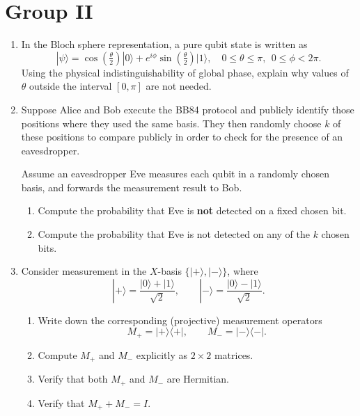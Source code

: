 \documentclass[12pt]{article}
\begin{document}
\section*{Group II}

\begin{enumerate}
\item In the Bloch sphere representation, a pure qubit state is written as
\[
|\psi\rangle
=
\cos\left(\tfrac{\theta}{2}\right)|0\rangle
+
e^{i\phi}\sin\left(\tfrac{\theta}{2}\right)|1\rangle,
\quad
0 \le \theta \le \pi,\ \ 0 \le \phi < 2\pi.
\]
Using the physical indistinguishability of global phase, explain why values of $\theta$ outside the interval $[0,\pi]$ are not needed.

\item 
Suppose Alice and Bob execute the BB84 protocol and publicly identify those positions where they used the same basis.
They then randomly choose $k$ of these positions to compare publicly in order to check for the presence of an eavesdropper.

Assume an eavesdropper Eve measures each qubit in a randomly chosen basis, and forwards the measurement result to Bob.

\begin{enumerate}
\item Compute the probability that Eve is \textbf{not} detected on a fixed chosen bit.
\item Compute the probability that Eve is not detected on any of the $k$ chosen bits.
\end{enumerate}

\item 
Consider measurement in the $X$-basis $\{|+\rangle,|-\rangle\}$, where
\[
|+\rangle = \frac{|0\rangle+|1\rangle}{\sqrt{2}}, 
\qquad 
|-\rangle = \frac{|0\rangle-|1\rangle}{\sqrt{2}}.
\]
\begin{enumerate}
\item Write down the corresponding (projective) measurement operators
\[
M_{+} = |+\rangle\langle +|,
\qquad
M_{-} = |-\rangle\langle -|.
\]
\item Compute $M_{+}$ and $M_{-}$ explicitly as $2\times 2$ matrices.
\item Verify that both $M_{+}$ and $M_{-}$ are Hermitian.
\item Verify that $M_{+} + M_{-} = I$.
\end{enumerate}

\end{enumerate}
\end{document}
